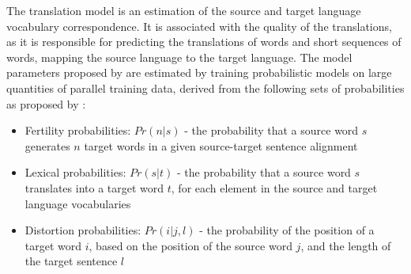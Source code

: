 




The translation model is an estimation of the source and target language vocabulary correspondence. It is associated with the quality of the translations, as it is responsible for predicting the translations of words and short sequences of words, mapping the source language to the target language. The model parameters proposed by are estimated by training probabilistic models on large quantities of parallel training data, derived from the following sets of probabilities as proposed by \cite{brown_statistical_1990}:
\begin{itemize}
    \item Fertility probabilities:  $Pr(n|s)$ - the probability that a source word $s$ generates $n$ target words in a given source-target sentence alignment
    
    \item Lexical probabilities: $Pr(s|t)$ - the probability that a source word $s$ translates into a target word $t$, for each element in the source and target language vocabularies
    
    \item Distortion probabilities: $Pr(i|j, l)$ - the probability of the position of a target word $i$, based on the position of the source word $j$, and the length of the target sentence $l$
    
    
\end{itemize}


